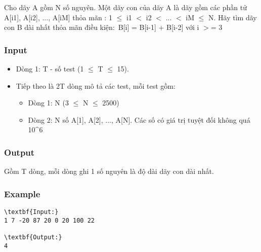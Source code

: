 

Cho dãy A gồm N số nguyên. Một dãy con của dãy A là dãy gồm các phần tử A[i1], A[i2], ..., A[iM] thỏa mãn : 1  $\le$  i1 $<$ i2 $<$ ... $<$ iM  $\le$  N. Hãy tìm dãy con B dài nhất thỏa mãn điều kiện: B[i] = B[i-1] + B[i-2] với i $>$= 3

\subsubsection{Input}
\begin{itemize}
	\item Dòng 1: T - số test (1  $\le$  T  $\le$  15).
	\item Tiếp theo là 2T dòng mô tả các test, mỗi test gồm:
\begin{itemize}
	\item Dòng 1: N (3  $\le$  N  $\le$  2500)
	\item Dòng 2: N số A[1], A[2], ..., A[N]. Các số có giá trị tuyệt đối không quá 10\textasciicircum6
\end{itemize}
\end{itemize}

\subsubsection{Output}

Gồm T dòng, mỗi dòng ghi 1 số nguyên là độ dài dãy con dài nhất.

\subsubsection{Example}
\begin{verbatim}
\textbf{Input:}
1 7 -20 87 20 0 20 100 22

\textbf{Output:}
4\end{verbatim}
